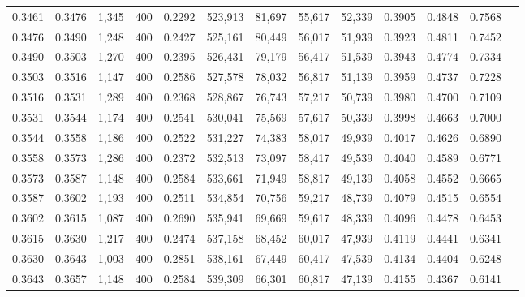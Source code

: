 \begin{tabular}{rrrrrrrrrrrrr}
0.3461 & 0.3476 &  1,345 &   400 &                                     0.2292 & 523,913 &  81,697 &  55,617 &  52,339 & 0.3905 & 0.4848 & 0.7568 \\
0.3476 & 0.3490 &  1,248 &   400 &                                     0.2427 & 525,161 &  80,449 &  56,017 &  51,939 & 0.3923 & 0.4811 & 0.7452 \\
0.3490 & 0.3503 &  1,270 &   400 &                                     0.2395 & 526,431 &  79,179 &  56,417 &  51,539 & 0.3943 & 0.4774 & 0.7334 \\
0.3503 & 0.3516 &  1,147 &   400 &                                     0.2586 & 527,578 &  78,032 &  56,817 &  51,139 & 0.3959 & 0.4737 & 0.7228 \\
0.3516 & 0.3531 &  1,289 &   400 &                                     0.2368 & 528,867 &  76,743 &  57,217 &  50,739 & 0.3980 & 0.4700 & 0.7109 \\
0.3531 & 0.3544 &  1,174 &   400 &                                     0.2541 & 530,041 &  75,569 &  57,617 &  50,339 & 0.3998 & 0.4663 & 0.7000 \\
0.3544 & 0.3558 &  1,186 &   400 &                                     0.2522 & 531,227 &  74,383 &  58,017 &  49,939 & 0.4017 & 0.4626 & 0.6890 \\
0.3558 & 0.3573 &  1,286 &   400 &                                     0.2372 & 532,513 &  73,097 &  58,417 &  49,539 & 0.4040 & 0.4589 & 0.6771 \\
0.3573 & 0.3587 &  1,148 &   400 &                                     0.2584 & 533,661 &  71,949 &  58,817 &  49,139 & 0.4058 & 0.4552 & 0.6665 \\
0.3587 & 0.3602 &  1,193 &   400 &                                     0.2511 & 534,854 &  70,756 &  59,217 &  48,739 & 0.4079 & 0.4515 & 0.6554 \\
0.3602 & 0.3615 &  1,087 &   400 &                                     0.2690 & 535,941 &  69,669 &  59,617 &  48,339 & 0.4096 & 0.4478 & 0.6453 \\
0.3615 & 0.3630 &  1,217 &   400 &                                     0.2474 & 537,158 &  68,452 &  60,017 &  47,939 & 0.4119 & 0.4441 & 0.6341 \\
0.3630 & 0.3643 &  1,003 &   400 &                                     0.2851 & 538,161 &  67,449 &  60,417 &  47,539 & 0.4134 & 0.4404 & 0.6248 \\
0.3643 & 0.3657 &  1,148 &   400 &                                     0.2584 & 539,309 &  66,301 &  60,817 &  47,139 & 0.4155 & 0.4367 & 0.6141 \\

\end{tabular}
